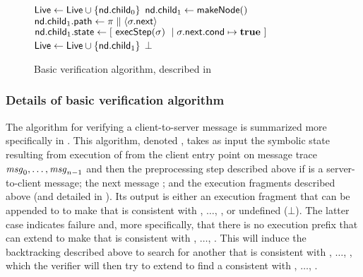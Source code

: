 \begin{figure}[h]
\begin{minipage}{\textwidth}
\begin{algorithm}[H]
\begin{algorithmic}[1]
      \label{fig:verifyAlg:branchFalse}
      \label{fig:verifyAlg:checkFalse}
        \State $\mathsf{Live} \gets \mathsf{Live} \cup \{\mathsf{nd}.\mathsf{child}_{0}\}$
        \label{fig:verifyAlg:addFalse}
      \EndIf
      \State $\mathsf{nd}.\mathsf{child}_{1} \gets \mathsf{makeNode}()$
      \label{fig:verifyAlg:makeChildTrue}
      \State $\mathsf{nd}.\mathsf{child}_{1}.\mathsf{path} \gets \pi \parallel \langle \sigma.\mathsf{next} \rangle$
      \State $\mathsf{nd}.\mathsf{child}_{1}.\mathsf{state} \gets [~\mathsf{execStep}(\sigma)~\mid \sigma.\mathsf{next}.\mathsf{cond} \mapsto \textbf{true}~]$
      \label{fig:verifyAlg:branchTrue}
      \label{fig:verifyAlg:checkTrue}
        \State $\mathsf{Live} \gets \mathsf{Live} \cup \{\mathsf{nd}.\mathsf{child}_{1}\}$
        \label{fig:verifyAlg:addTrue}
      \EndIf
    \EndIf
\EndWhile
\label{fig:verifyAlg:mainWhileEnd}
\State \Return $\bot$ 
\label{fig:verifyAlg:returnFailure}
\EndProcedure

\end{algorithmic}
\end{algorithm}
\end{minipage}
\caption{Basic verification algorithm, described in
\label{fig:verifyAlg}}
\end{figure}
\clearpage

\subsubsection{Details of basic verification algorithm}
The algorithm for verifying a client-to-server message is summarized
more specifically in .  This algorithm, denoted
\verifyAlg, takes as input the symbolic state 
resulting from execution of  from the client
entry point on message trace $\mathit{msg}_{0},\ldots,\mathit{msg}_{n-1}$ and
then the preprocessing step described above if  is a
server-to-client message; the next message \msg{\msgNmbr}; and the
execution fragments \trainingFrags{\msgNmbr} described above (and
detailed in ).  Its output is either
an execution fragment that can be appended to
 to make \execPrefix{\msgNmbr} that is
consistent with , $\ldots$, \msg{\msgNmbr}, or undefined
($\bot$).  The latter case indicates failure and, more specifically,
that there is no execution prefix that can extend
 to make \execPrefix{\msgNmbr} that is
consistent with , $\ldots$, .  This will induce
the backtracking described above to search for another
 that is consistent with , $\ldots$,
, which the verifier will then try to extend to find a
\execPrefix{\msgNmbr} consistent with , $\ldots$,
\msg{\msgNmbr}.

